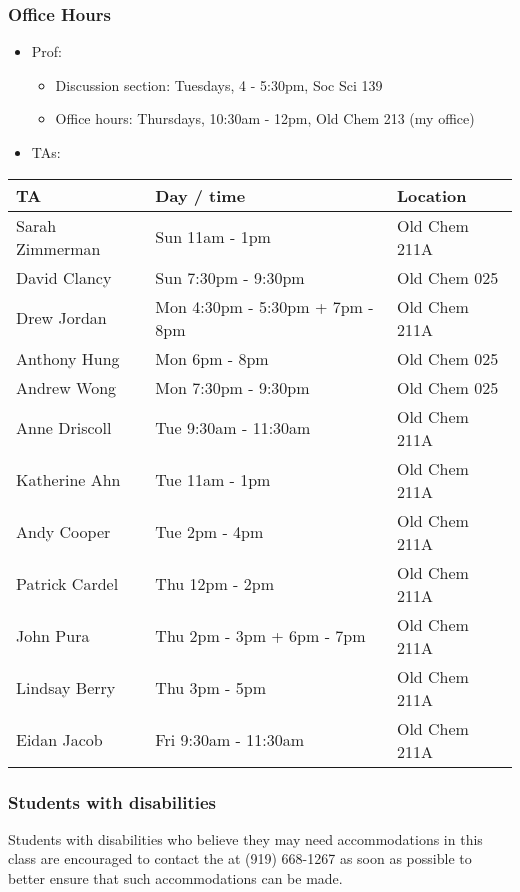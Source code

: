 \documentclass[11pt,containsverbatim,handout,xcolor=xelatex,dvipsnames,table]{beamer}
\begin{document}
\begin{frame}[shrink]
\frametitle{Office Hours}

\begin{itemize}
\item Prof:
\begin{itemize}
\item Discussion section: Tuesdays, 4 - 5:30pm, Soc Sci 139
\item Office hours: Thursdays, 10:30am - 12pm, Old Chem 213 (my office)
\end{itemize}
\item TAs: 
\end{itemize}
{\small
{}
\begin{tabular}{l | l | l}
TA				& Day / time						& Location \\
\hline
Sarah Zimmerman	& Sun 11am - 1pm					& Old Chem 211A \\
David Clancy		& Sun 7:30pm - 9:30pm				& Old Chem 025 \\
Drew Jordan		& Mon 4:30pm - 5:30pm + 7pm - 8pm	& Old Chem 211A \\
Anthony Hung		& Mon 6pm - 8pm					& Old Chem 025 \\
Andrew Wong		& Mon 7:30pm - 9:30pm				& Old Chem 025 \\ 
Anne Driscoll		& Tue 9:30am - 11:30am				& Old Chem 211A \\
Katherine Ahn		& Tue 11am - 1pm					& Old Chem 211A \\
Andy Cooper		& Tue 2pm - 4pm					& Old Chem 211A \\
Patrick Cardel 		& Thu 12pm - 2pm					& Old Chem 211A \\
John Pura			& Thu 2pm - 3pm + 6pm - 7pm			& Old Chem 211A \\
Lindsay Berry		& Thu 3pm - 5pm					& Old Chem 211A \\
Eidan Jacob		& Fri 9:30am - 11:30am				& Old Chem 211A
\end{tabular}
}

\end{frame}


\begin{frame}
\frametitle{Students with disabilities}

Students with disabilities who believe they may need accommodations in this class are 
encouraged to contact the 
 at (919) 668-1267 as soon as possible to better ensure that such 
accommodations can be made.

\vfill


\end{frame}
\end{document}
